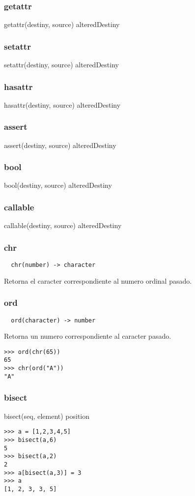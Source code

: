 \subsubsection*{getattr}
getattr(destiny, source) \rightarrow alteredDestiny
\subsubsection*{setattr}
setattr(destiny, source) \rightarrow alteredDestiny
\subsubsection*{hasattr}
hasattr(destiny, source) \rightarrow alteredDestiny
\subsubsection*{assert}
assert(destiny, source) \rightarrow alteredDestiny
\subsubsection*{bool}
bool(destiny, source) \rightarrow alteredDestiny
\subsubsection*{callable}
callable(destiny, source) \rightarrow alteredDestiny

\subsubsection*{chr}
\begin{verbatim}
  chr(number) -> character
\end{verbatim}
Retorna el caracter correspondiente al numero ordinal pasado.

\subsubsection*{ord}
\begin{verbatim}
  ord(character) -> number
\end{verbatim}
Retorna un numero correspondiente al caracter pasado.
\begin{lstlisting}[style=consola]
>>> ord(chr(65))
65
>>> chr(ord("A"))
"A"
\end{lstlisting}

\subsubsection*{bisect}
bisect(seq, element) \rightarrow position
\begin{lstlisting}[style=consola]
>>> a = [1,2,3,4,5]
>>> bisect(a,6)
5
>>> bisect(a,2)
2
>>> a[bisect(a,3)] = 3
>>> a
[1, 2, 3, 3, 5]
\end{lstlisting}

